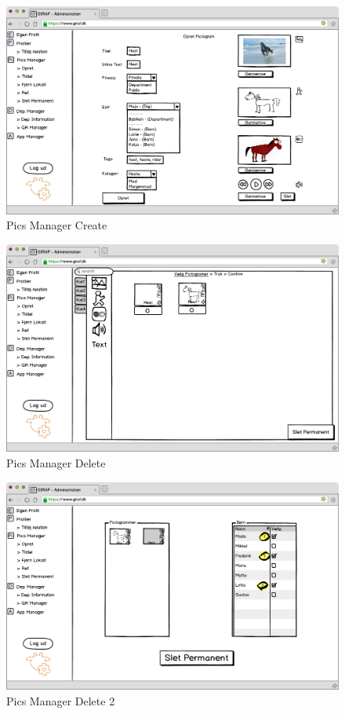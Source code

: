 \begin{figure}[p]
\centering
\includegraphics[width=1\textwidth]{images/mockup/picsManagerOpret.png}
\caption{Pics Manager Create}
\label{fig:pics_manager_create}
\end{figure}

\newpage

\begin{figure}[p]
\centering
\includegraphics[width=1\textwidth]{images/mockup/picsManagerSlet.png}
\caption{Pics Manager Delete}
\label{fig:pics_manager_delete}
\end{figure}

\begin{figure}[p]
\centering
\includegraphics[width=1\textwidth]{images/mockup/picsManagerSlet2.png}
\caption{Pics Manager Delete 2}
\label{fig:pics_manager_delete2}
\end{figure}

